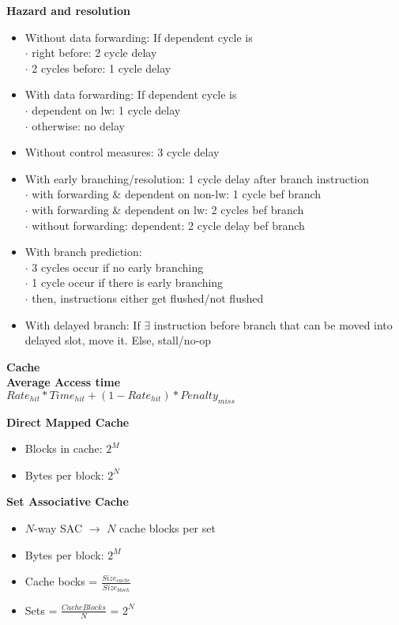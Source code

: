\documentclass[a4paper]{article} \usepackage[backend=biber, style=numeric, sorting=none]{biblatex}
\begin{document}
\begin{multicols*}{4}
\textbf{{Hazard and resolution}}
\begin{itemize}[leftmargin=*]
\itemsep -0.5em
\item Without data forwarding: If dependent cycle is
    \\ $\cdot$ right before: 2 cycle delay
    \\ $\cdot$ 2 cycles before: 1 cycle delay
\item With data forwarding: If dependent cycle is
    \\ $\cdot$ dependent on lw: 1 cycle delay
    \\ $\cdot$ otherwise: no delay
\item Without control measures: 3 cycle delay 
\item With early branching/resolution: 1 cycle delay after branch instruction  
    \\ $\cdot$ with forwarding \& dependent on non-lw: 1 cycle bef branch
    \\ $\cdot$ with forwarding \& dependent on lw: 2 cycles bef branch 
    \\ $\cdot$ without forwarding: dependent: 2 cycle delay bef branch 
\item With branch prediction: 
    \\ $\cdot$ 3 cycles occur if no early branching
    \\ $\cdot$ 1 cycle occur if there is early branching
    \\ $\cdot$ then, instructions either get flushed/not flushed
\item With delayed branch: If $\exists$ instruction before branch that can be moved into delayed slot, move it. Else, stall/no-op
\end{itemize}

{\small\textbf{Cache}}
\\ \textbf{{Average Access time}}
\\ $Rate_{hit} * Time_{hit} + (1 - Rate_{hit}) * Penalty_{miss}$

\textbf{{Direct Mapped Cache}}
\begin{itemize}[leftmargin=*]
\itemsep -0.5em
\item Blocks in cache: $2^M$
\item Bytes per block: $2^N$
\end{itemize}

\textbf{{Set Associative Cache}}
\begin{itemize}[leftmargin=*]
\itemsep -0.5em
\item $N$-way SAC $\rightarrow$ $N$ cache blocks per set
\item Bytes per block: $2^M$
\item Cache bocks = $\frac{Size_{cache}}{Size_{block}}$
\item Sets = $\frac{CacheBlocks}{N}$ = $2^N$
\end{itemize}


\end{multicols*}
\end{document}
